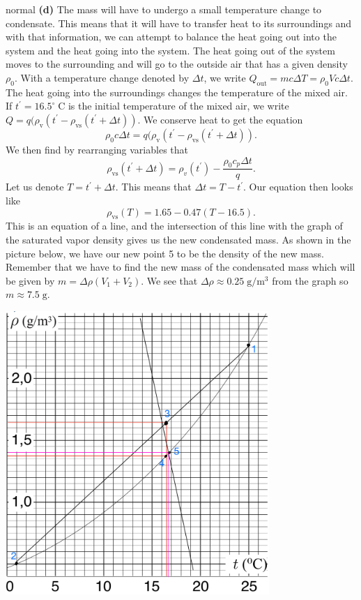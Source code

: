 \begin{solution}{normal}
\noindent \textbf{(d)} The mass will have to undergo a small temperature change to condensate. This means that it will have to transfer heat to its surroundings and with that information, we can attempt to balance the heat going out into the system and the heat going into the system. The heat going out of the system moves to the surrounding and will go to the outside air that has a given density $\rho_0$. With a temperature change denoted by $\Delta t$, we write $Q_{\text{out}} = mc\Delta T = \rho_0 V c\Delta t$. The heat going into the surroundings changes the temperature of the mixed air. If $t^{\prime} = 16.5^{\circ}\;\mathrm{C}$ is the initial temperature of the mixed air, we write $Q = q(\rho_{\text{v}} (t^{\prime} - \rho_{\text{vs}} (t^{\prime} + \Delta t))$. We conserve heat to get the equation
\[\rho_0 c\Delta t = q (\rho_{\text{v}} (t^{\prime} - \rho_{\text{vs}} (t^{\prime} + \Delta t)).\]We then find by rearranging variables that
\[\rho_{\text{vs}} (t^{\prime} + \Delta t) = \rho_v (t^{\prime}) - \frac{\rho_0 c_p \Delta t}{q}.\]Let us denote $T = t^{\prime} + \Delta t$. This means that $\Delta t = T - t^{\prime}$. Our equation then looks like
\[\rho_{\text{vs}} (T) = 1.65 - 0.47 (T - 16.5).\]This is an equation of a line, and the intersection of this line with the graph of the saturated vapor density gives us the new condensated mass. As shown in the picture below, we have our new point 5 to be the density of the new mass. Remember that we have to find the new mass of the condensated mass which will be given by $m = \Delta \rho (V_1 + V_2)$. We see that $\Delta \rho \approx 0.25\;\mathrm{g/m^3}$ from the graph so $m \approx 7.5\;\mathrm{g}$.
\begin{center}
    \includegraphics[width=10cm]{9B2F586B-C0CE-40D7-8A66-83E5A94057A5.jpeg}
\end{center}
\end{solution}